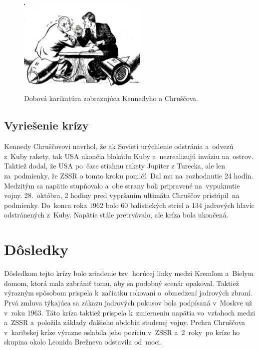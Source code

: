 \documentclass[a4paper]{article}
\begin{document}
\begin{figure}[htbp]
    \begin{center}
        \includegraphics[width=0.55\textwidth]{karikatura}
    \end{center}
    \caption{Dobová karikatúra zobrazujúca Kennedyho a Chruščova. \cite{hn}} 
    \label{karikatura}
\end{figure}

\subsection{Vyriešenie krízy}
Kennedy Chruščovovi navrhol, že ak Sovieti urýchlenie odstránia a~odvezú z~Kuby rakety, tak USA ukončia blokádu Kuby a~nezrealizujú inváziu na~ostrov. Taktiež dodal, že USA po~čase stiahnu rakety Jupiter z Turecka, ale len za~podmienky, že ZSSR o tomto kroku pomlčí. Dal mu na~rozhodnutie 24 hodín. Medzitým sa napätie stupňovalo a~obe strany boli pripravené na~vypuknutie vojny. 28.~októbra, 2 hodiny pred vypršaním ultimáta Chruščov pristúpil~na 
podmienky. Do~konca roka 1962 bolo 60 balistických striel a 134 jadrových hlavíc odstránených z~Kuby. Napätie stále pretrvávalo, ale kríza bola ukončená.

\section{Dôsledky}
Dôsledkom tejto krízy bolo zriadenie tzv. horúcej linky medzi Kremľom a~Bielym domom, ktorá mala zabrániť tomu, aby sa podobný scenár opakoval. \cite{dennikn} Taktiež výrazným spôsobom prispela k~začiatku rokovaní o~obmedzení jadrových zbraní. Prvá zmluva týkajúca sa zákazu jadrových pokusov bola podpísaná v~Moskve už v~roku 1963. Táto kríza taktiež prispela k~zmierneniu napätia vo~vzťahoch medzi a~ZSSR a~položila základy ďalšieho obdobia studenej vojny. Prehra Chruščova v~karibskej kríze výrazne oslabila jeho pozíciu v~ZSSR a~2~roky~po kríze ho skupina okolo Leonida Brežneva odstavila od~moci. \cite{hn}



\begingroup
\let\clearpage\relax
\section*{\indexname}
\printindex
\endgroup
\end{document}

